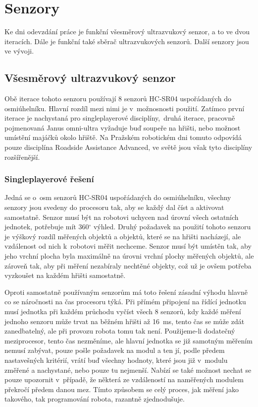 \chapter{Senzory}
Ke dni odevzdání práce je funkční všesměrový ultrazvukový senzor, a to ve dvou iteracích.
Dále je funkční také sběrač ultrazvukových senzorů.
Další senzory jsou ve vývoji.

\section{Všesměrový ultrazvukový senzor}
Obě iterace tohoto senzoru používají 8 senzorů HC-SR04 uspořádaných do osmiúhelníku.
Hlavní rozdíl mezi nimi je v~možnosnosti použití.
Zatímco první iterace je nachystaná pro singleplayerové disciplíny,~druhá iterace, pracovně pojmenovaná Janus omni-ultra vyžaduje buď soupeře na hřišti, nebo možnost umístění majáčků okolo hřiště. 
Na Pražském robotickém dni tomuto odpovídá pouze disciplína Roadside Assistance Advanced\cite{roadside}, ve světě jsou však tyto disciplíny rozšířenější.

\subsection{Singleplayerové řešení}
Jedná se o~osm senzorů HC-SR04 uspořádaných do osmiúhelníku, všechny senzory jsou svedeny do procesoru tak, aby se každý dal číst a aktivovat samostatně.
Senzor musí být na robotovi uchycen nad úrovní všech ostatních jednotek, potřebuje mít 360$^{\circ}$ výhled.
Druhý požadavek na použití tohoto senzoru je výškový rozdíl měřených objektů a objektů, které se na hřišti nacházejí, ale vzdálenost od nich k~robotovi měřit nechceme.
Senzor musí být umístěn tak, aby jeho vrchní plocha byla maximálně na úrovni vrchní plochy měřených objektů, ale zároveň tak, aby při měření nezabíraly nechtěné objekty, což už je ovšem potřeba vyzkoušet na každém hřišti samostatně.

Oproti samostatně používaným senzorům má toto řešení zásadní výhodu hlavně co se náročnosti na čas procesoru týká.
Při přímém připojení na řídící jednotku musí jednotka při každém průchodu vyčíst všech 8 senzorů, kdy každé měření jednoho senzoru může trvat na běžném hřišti až 16~ms, tento čas se může zdát zanedbatelný, ale při provozu robota tomu tak není.
Použijeme-li dodatečný meziprocesor, tento čas nezměníme, ale hlavní jednotka se již samotným měřením nemusí zabývat, pouze pošle požadavek na modul a ten jí, podle předem nastavešných kritérií, vrátí buď všechny hodnoty, které jsou již v~modulu změřené a nachystané, nebo pouze tu nejmenší.
Nabízí se také možnost nechat se pouze upozornit v~případě, že některá ze vzdáleností na naměřených modulem překročí předem danou mez.
Tímto způsobem se celý proces, jak měření jako takového, tak programování robota, razantně zjednodušuje.  

